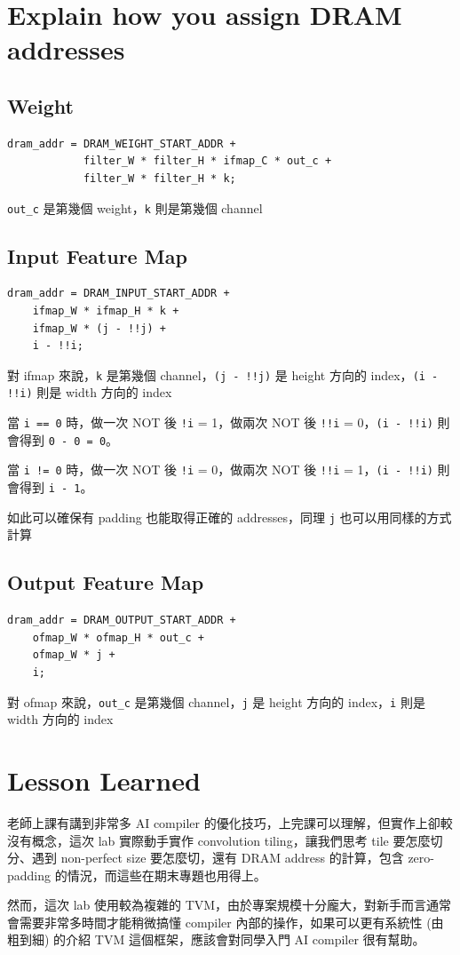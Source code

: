 \documentclass{article}
\begin{document}
\section{Explain how you assign DRAM addresses}

\subsection{Weight}

\begin{verbatim}
dram_addr = DRAM_WEIGHT_START_ADDR +
            filter_W * filter_H * ifmap_C * out_c +
            filter_W * filter_H * k;
\end{verbatim}

\verb|out_c| 是第幾個 weight，\verb|k| 則是第幾個 channel

\subsection{Input Feature Map}

\begin{verbatim}
dram_addr = DRAM_INPUT_START_ADDR +
    ifmap_W * ifmap_H * k +
    ifmap_W * (j - !!j) +
    i - !!i;
\end{verbatim}

對 ifmap 來說，\verb|k| 是第幾個 channel，\verb|(j - !!j)| 是 height 方向的 index，\verb|(i - !!i)| 則是 width 方向的 index

當 \verb|i == 0| 時，做一次 NOT 後 \verb|!i| = 1，做兩次 NOT 後 \verb|!!i| = 0，\verb|(i - !!i)| 則會得到 \verb|0 - 0 = 0|。

當 \verb|i != 0| 時，做一次 NOT 後 \verb|!i| = 0，做兩次 NOT 後 \verb|!!i| = 1，\verb|(i - !!i)| 則會得到 \verb|i - 1|。

如此可以確保有 padding 也能取得正確的 addresses，同理 \verb|j| 也可以用同樣的方式計算

\subsection{Output Feature Map}

\begin{verbatim}
dram_addr = DRAM_OUTPUT_START_ADDR +
    ofmap_W * ofmap_H * out_c +
    ofmap_W * j +
    i;
\end{verbatim}

對 ofmap 來說，\verb|out_c| 是第幾個 channel，\verb|j| 是 height 方向的 index，\verb|i| 則是 width 方向的 index

\section{Lesson Learned}

老師上課有講到非常多 AI compiler 的優化技巧，上完課可以理解，但實作上卻較沒有概念，這次 lab 實際動手實作 convolution tiling，讓我們思考 tile 要怎麼切分、遇到 non-perfect size 要怎麼切，還有 DRAM address 的計算，包含 zero-padding 的情況，而這些在期末專題也用得上。

然而，這次 lab 使用較為複雜的 TVM，由於專案規模十分龐大，對新手而言通常會需要非常多時間才能稍微搞懂 compiler 內部的操作，如果可以更有系統性 (由粗到細) 的介紹 TVM 這個框架，應該會對同學入門 AI compiler 很有幫助。
\end{document}
